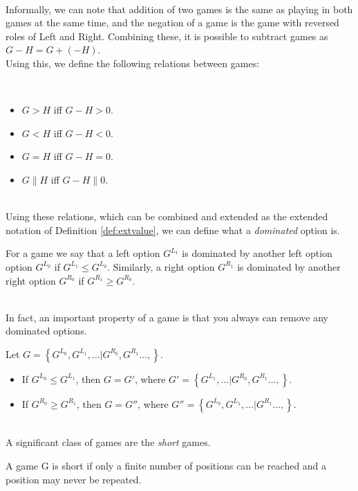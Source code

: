 ~\\
Informally, we can note that addition of two games is the same as playing in both games at the same time, and the negation of a game is the game with reversed roles of Left and Right. Combining these, it is possible to subtract games as $G-H=G+(-H)$. 
\\
Using this, we define the following relations between games:
\begin{defn}
~
\begin{itemize}
\item $G>H$ iff $G-H>0$.
\item $G<H$ iff $G-H<0$.
\item $G=H$ iff $G-H=0$.
\item $G\parallel H$ iff $G-H\parallel0$.
\end{itemize}
\end{defn}
~\\
Using these relations, which can be combined and extended as the extended notation of Definition \ref{def:extvalue}, we can define what a \emph{dominated} option is.
\begin{defn}
\label{def:dominate}
For a game we say that a left option $G^{L_1}$ is dominated by another left option option $G^{L_0}$ if $G^{L_1}\le G^{L_0}$. Similarly, a right option $G^{R_1}$ is dominated by another right option $G^{R_0}$ if $G^{R_1}\ge G^{R_0}$.
\end{defn}
~\\
In fact, an important property of a game is that you always can remove any dominated options{\cite[p.~110]{onag}}.
\begin{thm}
\label{thm:domopt}
Let $G=\left\{G^{L_0},G^{L_1},\dots|G^{R_0},G^{R_1}\dots,\right\}$. 
\begin{itemize}
\item If $G^{L_0}\le G^{L_1}$, then $G=G'$, where $G'=\left\{G^{L_1},\dots|G^{R_0},G^{R_1}\dots,\right\}$.
\item If $G^{R_0}\ge G^{R_1}$, then $G=G''$, where $G''=\left\{G^{L_0},G^{L_1},\dots|G^{R_1}\dots,\right\}$.
\end{itemize}
\end{thm}
~\\
A significant class of games are the \emph{short} games.
\begin{defn}
A game G is short if only a finite number of positions can be reached and a position may never be repeated.
\end{defn}
